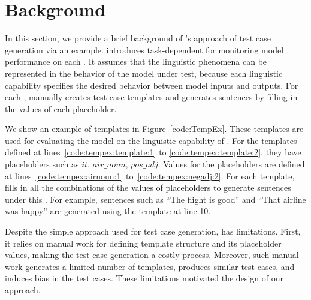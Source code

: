 \section{Background}
\label{sec:background}

In this section, we provide a brief background of \Cklst's \cite{marcoACL2020checklist} approach of test case generation
 via an example.
\Cklst
introduces task-dependent \lcs for monitoring model performance on
each \lc. It assumes that the linguistic phenomena can be represented
in the behavior of the model under test, because each linguistic capability specifies the desired behavior between model inputs and outputs. For each \lc, \Cklst manually creates
test case templates and generates sentences by filling in the values of
each placeholder.

\begin{figure}[t]
 \centering
 
 \vspace{-10pt}
 \caption{\CklstTemplateFigCaption}
 \vspace{-10pt}
\end{figure}

We show an example of \Cklst templates in
Figure~\ref{code:TempEx}. These templates are used for
evaluating the \sa model on the linguistic capability of \SareqExThree.
For the templates defined
at lines~\ref{code:tempex:template:1} to \ref{code:tempex:template:2}, they
have placeholders such as ${it}$, ${air\_noun}$, ${pos\_adj}$. Values
for the placeholders are defined at
lines~\ref{code:tempex:airnoun:1} to~\ref{code:tempex:negadj:2}.
For each template, \Cklst fills in all the combinations of the
values of placeholders to generate sentences under this \lc.
For example, sentences such as ``The flight is good'' and ``That
airline was happy'' are generated using the template at line 10.

Despite the simple approach used for test case generation, \Cklst has
limitations. First, it relies on manual work for defining template
structure and its placeholder values, making the test case
generation a costly process. Moreover, such
manual work generates a limited number of templates, produces similar test cases, and induces bias in the test cases. These limitations motivated the design of our approach.